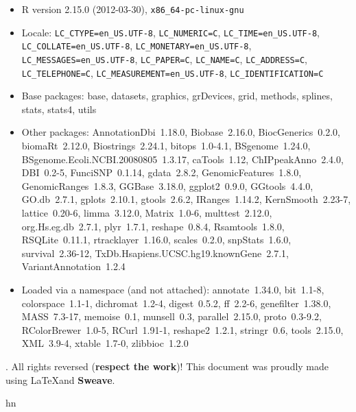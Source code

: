 \documentclass[12pt,fullpage]{article}
\begin{document}
\begin{itemize}\raggedright
  \item R version 2.15.0 (2012-03-30), \verb|x86_64-pc-linux-gnu|
  \item Locale: \verb|LC_CTYPE=en_US.UTF-8|, \verb|LC_NUMERIC=C|, \verb|LC_TIME=en_US.UTF-8|, \verb|LC_COLLATE=en_US.UTF-8|, \verb|LC_MONETARY=en_US.UTF-8|, \verb|LC_MESSAGES=en_US.UTF-8|, \verb|LC_PAPER=C|, \verb|LC_NAME=C|, \verb|LC_ADDRESS=C|, \verb|LC_TELEPHONE=C|, \verb|LC_MEASUREMENT=en_US.UTF-8|, \verb|LC_IDENTIFICATION=C|
  \item Base packages: base, datasets, graphics, grDevices, grid,
    methods, splines, stats, stats4, utils
  \item Other packages: AnnotationDbi~1.18.0, Biobase~2.16.0,
    BiocGenerics~0.2.0, biomaRt~2.12.0, Biostrings~2.24.1,
    bitops~1.0-4.1, BSgenome~1.24.0,
    BSgenome.Ecoli.NCBI.20080805~1.3.17, caTools~1.12,
    ChIPpeakAnno~2.4.0, DBI~0.2-5, FunciSNP~0.1.14, gdata~2.8.2,
    GenomicFeatures~1.8.0, GenomicRanges~1.8.3, GGBase~3.18.0,
    ggplot2~0.9.0, GGtools~4.4.0, GO.db~2.7.1, gplots~2.10.1,
    gtools~2.6.2, IRanges~1.14.2, KernSmooth~2.23-7, lattice~0.20-6,
    limma~3.12.0, Matrix~1.0-6, multtest~2.12.0, org.Hs.eg.db~2.7.1,
    plyr~1.7.1, reshape~0.8.4, Rsamtools~1.8.0, RSQLite~0.11.1,
    rtracklayer~1.16.0, scales~0.2.0, snpStats~1.6.0, survival~2.36-12,
    TxDb.Hsapiens.UCSC.hg19.knownGene~2.7.1, VariantAnnotation~1.2.4
  \item Loaded via a namespace (and not attached): annotate~1.34.0,
    bit~1.1-8, colorspace~1.1-1, dichromat~1.2-4, digest~0.5.2,
    ff~2.2-6, genefilter~1.38.0, MASS~7.3-17, memoise~0.1, munsell~0.3,
    parallel~2.15.0, proto~0.3-9.2, RColorBrewer~1.0-5, RCurl~1.91-1,
    reshape2~1.2.1, stringr~0.6, tools~2.15.0, XML~3.9-4, xtable~1.7-0,
    zlibbioc~1.2.0
\end{itemize}
. All rights reversed (\textbf{respect the work})! This
document was proudly made using \LaTeX and \textbf{Sweave}.

hn
\end{document}
